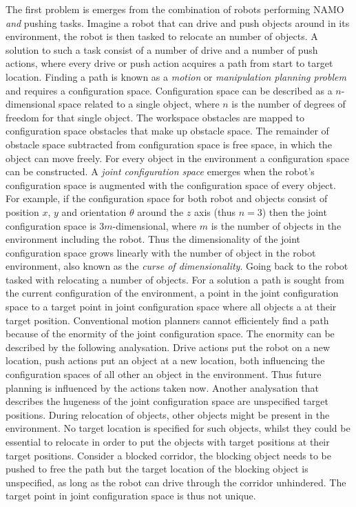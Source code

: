 The first problem is emerges from the combination of robots performing \ac{NAMO} \textit{and} pushing tasks. Imagine a robot that can drive and push objects around in its environment, the robot is then tasked to relocate an number of objects. A solution to such a task consist of a number of drive and a number of push actions, where every drive or push action acquires a path from start to target location. Finding a path  is known as a \textit{motion} or \textit{manipulation planning problem} and requires a configuration space. Configuration space can be described as a $n$-dimensional space related to a single object, where $n$ is the number of degrees of freedom for that single object. The workspace obstacles are mapped to configuration space obstacles that make up obstacle space. The remainder of obstacle space subtracted from configuration space is free space, in which the object can move freely. For every object in the environment a configuration space can be constructed. A \textit{joint configuration space} emerges when the robot's configuration space is augmented with the configuration space of every object. For example, if the configuration space for both robot and objects consist of position $x$, $y$ and orientation $\theta$ around the $z$ axis (thus $n=3$) then the joint configuration space is $3m$-dimensional, where $m$ is the number of objects in the environment including the robot. Thus the dimensionality of the joint configuration space grows linearly with the number of object in the robot environment, also known as the \textit{curse of dimensionality}. Going back to the robot tasked with relocating a number of objects. For a solution a path is sought from the current configuration of the environment, a point in the joint configuration space to a target point in joint configuration space where all objects a at their target position. Conventional motion planners cannot efficientely find a path because of the enormity of the joint configuration space. The enormity can be described by the following analysation. Drive actions put the robot on a new location, push actions put an object at a new location, both influencing the configuration spaces of all other an object in the environment. Thus future planning is influenced by the actions taken now. Another analysation that describes the hugeness of the joint configuration space are unspecified target positions. During relocation of objects, other objects might be present in the environment. No target location is specified for such objects, whilst they could be essential to relocate in order to put the objects with target positions at their target positions. Consider a blocked corridor, the blocking object needs to be pushed to free the path but the target location of the blocking object is unspecified, as long as the robot can drive through the corridor unhindered. The target point in joint configuration space is thus not unique.\bs

